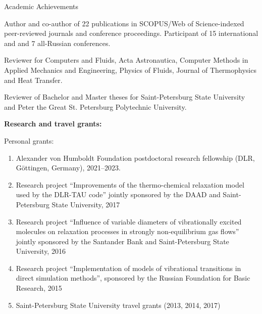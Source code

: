 \documentclass{resume} %
\begin{document}
\begin{rSection}{Academic Achievements}

Author and co-author of 22 publications in SCOPUS/Web of Science-indexed peer-reviewed journals and conference proceedings.
Participant of 15 international and and 7 all-Russian conferences.

Reviewer for Computers and Fluids, Acta Astronautica, Computer Methods in Applied Mechanics and Engineering, Physics of Fluids, Journal of Thermophysics and Heat Transfer.

Reviewer of Bachelor and Master theses for Saint-Petersburg State University and Peter the Great St. Petersburg Polytechnic University.



{\bf Research and travel grants:}


Personal grants:
\begin{enumerate}

    \item Alexander von Humboldt Foundation postdoctoral research fellowship (DLR,  G\"{o}ttingen, Germany), 2021--2023.
    \item Research project ``Improvements of the thermo-chemical relaxation model used by the DLR-TAU code'' jointly sponsored by the DAAD and Saint-Petersburg State University, 2017
    \item Research project ``Influence of variable diameters of vibrationally excited molecules on relaxation processes in strongly non-equilibrium gas flows'' jointly sponsored by the Santander Bank and Saint-Petersburg State University, 2016
    \item Research project ``Implementation of models of vibrational transitions in direct simulation methods'', sponsored by the Russian Foundation for Basic Research, 2015
    \item Saint-Petersburg State University travel grants (2013, 2014, 2017)


\end{enumerate}
\end{rSection}
\end{document}
